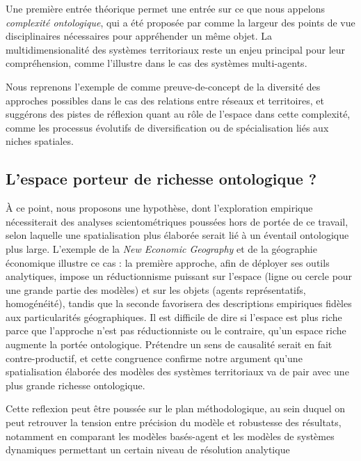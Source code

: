 \documentclass[11pt]{article}
\begin{document}
Une première entrée théorique permet une entrée sur ce que nous appelons \emph{complexité ontologique}, qui a été proposée par \cite{pumain2003approche} comme la largeur des points de vue disciplinaires nécessaires pour appréhender un même objet. La multidimensionalité des systèmes territoriaux reste un enjeu principal pour leur compréhension, comme l'illustre \cite{perez2016agent} dans le cas des systèmes multi-agents.


Nous reprenons l'exemple de \citep{raimbault2017invisible} comme preuve-de-concept de la diversité des approches possibles dans le cas des relations entre réseaux et territoires, et suggérons des pistes de réflexion quant au rôle de l'espace dans cette complexité, comme les processus évolutifs de diversification ou de spécialisation liés aux niches spatiales.





\subsection{L'espace porteur de richesse ontologique ?}

À ce point, nous proposons une hypothèse, dont l'exploration empirique nécessiterait des analyses scientométriques poussées hors de portée de ce travail, selon laquelle une spatialisation plus élaborée serait lié à un éventail ontologique plus large. L'exemple de la \emph{New Economic Geography} et de la géographie économique illustre ce cas \cite{marchionni2004geographical}: la première approche, afin de déployer ses outils analytiques, impose un réductionnisme puissant sur l'espace (ligne ou cercle pour une grande partie des modèles) et sur les objets (agents représentatifs, homogénéité), tandis que la seconde favorisera des descriptions empiriques fidèles aux particularités géographiques. Il est difficile de dire si l'espace est plus riche parce que l'approche n'est pas réductionniste ou le contraire, qu'un espace riche augmente la portée ontologique. Prétendre un sens de causalité serait en fait contre-productif, et cette congruence confirme notre argument qu'une spatialisation élaborée des modèles des systèmes territoriaux va de pair avec une plus grande richesse ontologique.

Cette reflexion peut être poussée sur le plan méthodologique, au sein duquel on peut retrouver la tension entre précision du modèle et robustesse des résultats, notamment en comparant les modèles basés-agent et les modèles de systèmes dynamiques permettant un certain niveau de résolution analytique
\end{document}
